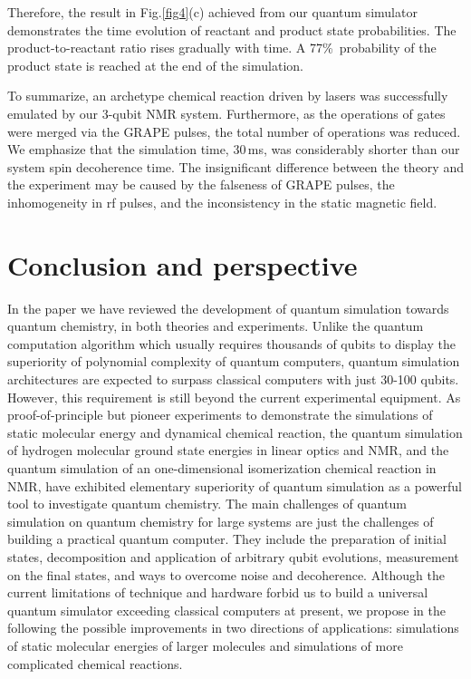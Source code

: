 \documentclass[8.5pt,twoside,twocolumn]{article}
\begin{document}
Therefore, the result in Fig.\ref{fig4}(c) achieved
from our quantum simulator demonstrates the time evolution of
reactant and product state probabilities.
The product-to-reactant ratio
rises gradually with time. A 77\%\ probability of
the product state is reached at the end of the simulation.

To summarize, an archetype chemical reaction driven by lasers
was successfully emulated by our 3-qubit NMR system.
Furthermore, as the operations of gates were merged via the GRAPE pulses,
the total number of operations was reduced.
We emphasize that the simulation time, 30\,ms, was considerably
shorter than our system spin decoherence time.
The insignificant difference
between the theory and the experiment may be caused by
the falseness of GRAPE pulses,
the inhomogeneity in rf pulses,
and the inconsistency in the static magnetic field.

\section{Conclusion and perspective}

In the paper we have reviewed the development of quantum simulation
towards quantum chemistry, in both theories and experiments.
Unlike the quantum computation algorithm which usually requires
thousands of qubits to display the superiority of polynomial
complexity of quantum computers,
quantum simulation architectures are expected to
surpass classical computers with just 30-100 qubits.
However, this requirement is still beyond the current
experimental equipment.
As proof-of-principle but pioneer experiments to
demonstrate the simulations of static molecular energy\cite{Alan_first}
and dynamical chemical reaction,\cite{Simulating_chemistry_computer}
the quantum simulation of hydrogen molecular ground state energies
in linear optics\cite{Optics_static} and NMR,\cite{NMR_static}
and the quantum simulation of an one-dimensional isomerization
chemical reaction in NMR,\cite{NMR_dynamic}
have exhibited elementary superiority
of quantum simulation as a powerful tool
to investigate quantum chemistry.
The main challenges of quantum simulation on quantum chemistry
for large systems are just the challenges
of building a practical quantum computer.
They include the preparation of initial states,
decomposition and application of arbitrary qubit evolutions,
measurement on the final states,
and ways to overcome noise and decoherence.
Although the current limitations of technique and hardware forbid us
to build a universal quantum simulator exceeding classical computers at present,
we propose in the following the possible improvements
in two directions of applications:
simulations of static molecular energies of larger molecules
and simulations of more complicated chemical reactions.
\end{document}
